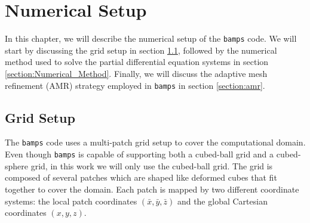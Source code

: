 
\chapter{Numerical Setup}
\label{chapter:numerical_setup}

In this chapter, we will describe the numerical setup of the \texttt{bamps} code. We will start by discussing the grid setup in section \ref{section:grid}, followed by the numerical method used to solve the partial differential equation systems in section \ref{section:Numerical_Method}. Finally, we will discuss the adaptive mesh refinement (AMR) strategy employed in \texttt{bamps} in section \ref{section:amr}.

\section{Grid Setup}
\label{section:grid}

The \texttt{bamps} code uses a multi-patch grid setup to cover the computational domain. Even though \texttt{bamps} is capable of supporting both a cubed-ball grid and a cubed-sphere grid, in this work we will only use the cubed-ball grid. The grid is composed of several patches which are shaped like deformed cubes that fit together to cover the domain. Each patch is mapped by two different coordinate systems: the local patch coordinates $(\bar{x},\bar{y},\bar{z})$ and the global Cartesian coordinates $(x,y,z)$.

